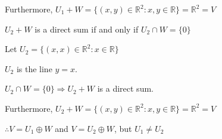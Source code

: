 \documentclass{article}
\begin{document}
\begin{enumerate}[nolistsep]
		Furthermore, $U_1 + W = \{(x, y) \in \mathbb{R}^2 : x,y \in \mathbb{R}\} = \mathbb{R}^2 = V$
		
		$U_2 + W$ is a direct sum if and only if $U_2 \cap W = \{0\}$
		
		Let $U_2 = \{(x, x) \in \mathbb{R}^2 : x \in \mathbb{R}\}$
		
		$U_2$ is the line $y = x$. 
		
		$U_2 \cap W = \{0\} \Rightarrow U_2 + W$ is a direct sum.
		
		Furthermore, $U_2 + W = \{(x, y) \in \mathbb{R}^2 : x,y \in \mathbb{R}\} = \mathbb{R}^2 = V$
		
		$\therefore V = U_1 \oplus W$ and $V = U_2 \oplus W$, but $U_1 \neq U_2$
	\end{enumerate}
\end{document}
